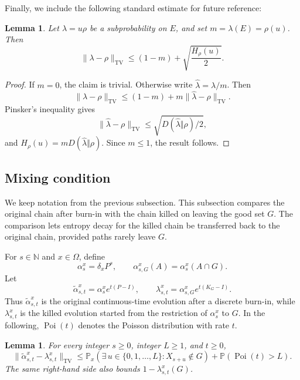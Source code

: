 \documentclass[11pt, reqno]{amsart}
\numberwithin{equation}{section}
\newtheorem{lemma}[theorem]{Lemma}
\newcommand{\TV}{\mathrm{TV}}
\newcommand{\Prob}{\mathbb P}
\begin{document}
Finally, we include the following standard estimate for future reference:

\begin{lemma}\label{lem:abstract-subprob-tv}
Let \(\lambda=u\rho\) be a subprobability on \(E\), and set
\(m=\lambda(E)=\rho(u)\).  Then
\[
    \|\lambda-\rho\|_{\TV}
    \le
    (1-m)+\sqrt{\frac{H_\rho(u)}2}.
\]
\end{lemma}

\begin{proof}
If \(m=0\), the claim is trivial.  Otherwise write
\(\widehat\lambda=\lambda/m\).  Then
\[
    \|\lambda-\rho\|_{\TV}
    \le
    (1-m)+m\|\widehat\lambda-\rho\|_{\TV}.
\]
Pinsker's inequality gives
\[
    \|\widehat\lambda-\rho\|_{\TV}
    \le \sqrt{D(\widehat\lambda\Vert\rho)/2},
\]
and \(H_\rho(u)=mD(\widehat\lambda\Vert\rho)\).  Since \(m\le1\), the result
follows.
\end{proof}

\subsection{Mixing condition}\label{subsec:abstract-mixing}

We keep notation from the previous subsection. This subsection compares the original chain after burn-in with the chain killed on leaving the good set \(G\). The comparison lets entropy decay for the killed chain be transferred back to the original chain, provided paths rarely leave \(G\).

For $s \in \mathbb{N}$ and \(x\in\Omega\), define
\[
    \alpha_s^x=\delta_xP^s,
    \qquad
    \alpha_{s,G}^x(A)=\alpha_s^x(A\cap G).
\]
Let
\[
    \widetilde\alpha_{s,t}^x=\alpha_s^x e^{t(P-I)},
    \qquad
    \lambda_{s,t}^x=\alpha_{s,G}^x e^{t(K_G-I)}.
\]
Thus \(\widetilde\alpha_{s,t}^x\) is the original continuous-time evolution
after a discrete burn-in, while \(\lambda_{s,t}^x\) is the killed evolution
started from the restriction of \(\alpha_s^x\) to \(G\). In the following, $\operatorname{Poi}(t)$ denotes the Poisson distribution with rate $t$.

\begin{lemma}\label{lem:abstract-path-comparison}
For every integer \(s\ge0\), integer \(L\ge1\), and \(t\ge0\),
\begin{equation}\label{eq:abstract-path-comparison}
    \|\widetilde\alpha_{s,t}^x-\lambda_{s,t}^x\|_{\TV}
    \le
    \Prob_x(\exists\,u\in\{0,1,\ldots,L\}:X_{s+u}\notin G)
    +\Prob(\operatorname{Poi}(t)>L).
\end{equation}
The same right-hand side also bounds \(1-\lambda_{s,t}^x(G)\).
\end{lemma}
\end{document}
